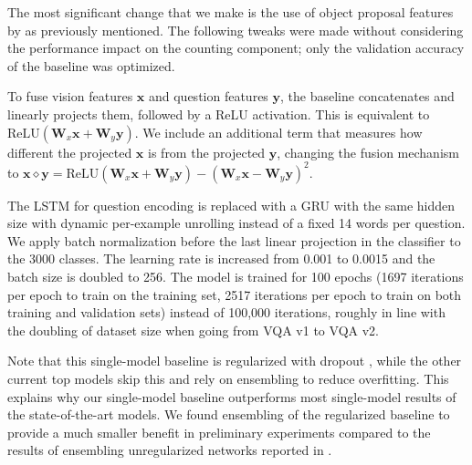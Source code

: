 \documentclass[letterpaper]{article}
\newcommand{\m}[1]{\mathbf{#1}}
\begin{document}
The most significant change that we make is the use of object proposal features by \citet{Anderson2017a} as previously mentioned.
The following tweaks were made without considering the performance impact on the counting component; only the validation accuracy of the baseline was optimized.

To fuse vision features $\m x$ and question features $\m y$, the baseline concatenates and linearly projects them, followed by a ReLU activation.
This is equivalent to $\text{ReLU}(\m W_x \m x + \m W_y \m y)$.
We include an additional term that measures how different the projected $\m x$ is from the projected $\m y$, changing the fusion mechanism to $\m x \diamond \m y= \text{ReLU}(\m W_x \m x + \m W_y \m y) - (\m W_x \m x - \m W_y \m y)^2$.

The LSTM \citep{Hochreiter1997a} for question encoding is replaced with a GRU \citep{Cho2014a} with the same hidden size with dynamic per-example unrolling instead of a fixed 14 words per question.
We apply batch normalization \citep{Ioffe2015a} before the last linear projection in the classifier to the 3000 classes.
The learning rate is increased from 0.001 to 0.0015 and the batch size is doubled to 256.
The model is trained for 100 epochs (1697 iterations per epoch to train on the training set, 2517 iterations per epoch to train on both training and validation sets) instead of 100,000 iterations, roughly in line with the doubling of dataset size when going from VQA v1 to VQA v2.

Note that this single-model baseline is regularized with dropout \citep{Srivastava2014a}, while the other current top models skip this and rely on ensembling to reduce overfitting.
This explains why our single-model baseline outperforms most single-model results of the state-of-the-art models.
We found ensembling of the regularized baseline to provide a much smaller benefit in preliminary experiments compared to the results of ensembling unregularized networks reported in \citet{Teney2017a}.
\end{document}
